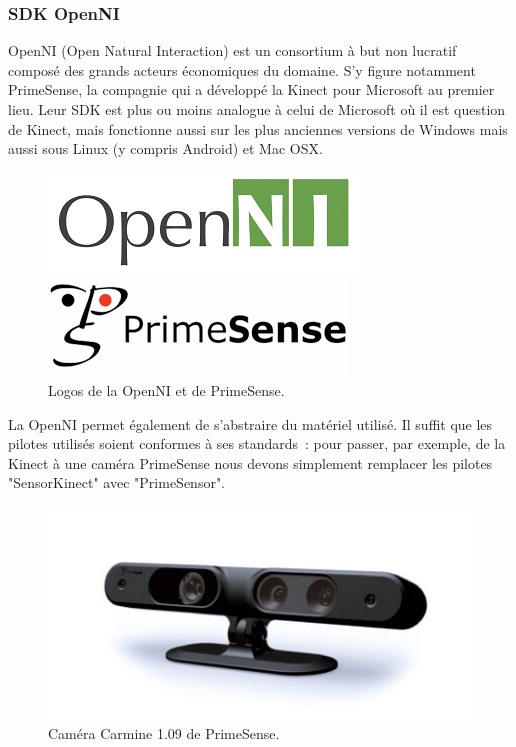 \subsubsection{SDK OpenNI}
OpenNI (Open Natural Interaction) est un consortium à but non lucratif composé
des grands acteurs économiques du domaine. S'y figure notamment PrimeSense, la 
compagnie qui a développé la Kinect pour Microsoft au premier lieu. Leur SDK
est plus ou moins analogue à celui de Microsoft où il est question de
Kinect, mais fonctionne aussi sur les plus anciennes 
versions de Windows mais
aussi sous Linux (y compris Android) et Mac OSX.
\begin{figure}[h!]
\begin{minipage}{0.49\linewidth}
  \centering
  \includegraphics[width=0.9\linewidth]{../images/openni_logo}
\end{minipage}
\begin{minipage}{0.49\linewidth}
  \centering
  \includegraphics[width=0.9\linewidth]{../images/primesense_logo}
\end{minipage}

\caption{Logos de la OpenNI et de PrimeSense.}
\end{figure}
La OpenNI permet également de s'abstraire du matériel utilisé. Il suffit que
les pilotes utilisés soient conformes à ses standards~: pour passer, par 
exemple, de la Kinect à une caméra PrimeSense nous devons simplement remplacer 
les pilotes "SensorKinect" avec "PrimeSensor".
\begin{figure}[h!]
\centering
\includegraphics[width=0.6\linewidth]{../images/primesense_camera}
\caption{Caméra Carmine 1.09 de PrimeSense.}
\end{figure}

